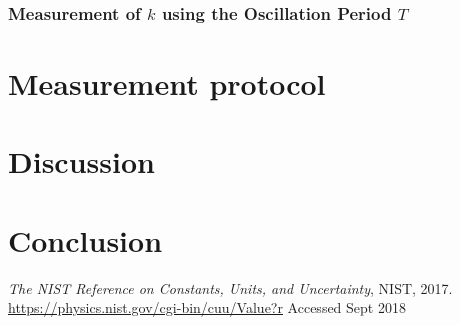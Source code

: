 \documentclass[11pt, a4paper]{article}
\begin{document}
\subsubsection{Measurement of $k$ using the Oscillation Period $T$}




\section{Measurement protocol} %
\begin{center}

\end{center}






\section{Discussion} %






\section{Conclusion}



\begin{thebibliography}{9}%




  \emph{The NIST Reference on Constants, Units, and Uncertainty},
  NIST,
  2017. \\
  \url{https://physics.nist.gov/cgi-bin/cuu/Value?r}
  Accessed Sept 2018
\end{thebibliography}
\end{document}
